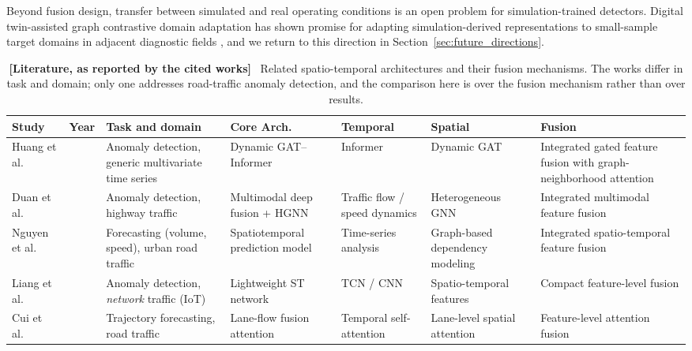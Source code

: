 \documentclass[journal]{IEEEtran}
\begin{document}
Beyond fusion design, transfer between simulated and real operating conditions is an open problem for simulation-trained detectors. Digital twin-assisted graph contrastive domain adaptation has shown promise for adapting simulation-derived representations to small-sample target domains in adjacent diagnostic fields \cite{gcda_bearing}, and we return to this direction in Section~\ref{sec:future_directions}.

\begin{table}[!t]
\centering
\caption{\textbf{[Literature, as reported by the cited works]}~ Related spatio-temporal architectures and their fusion mechanisms. The works differ in task and domain; only one addresses road-traffic anomaly detection, and the comparison here is over the fusion mechanism rather than over results.}
\label{tab:comparison}
\renewcommand{\arraystretch}{1.25}
\footnotesize
\setlength{\tabcolsep}{3pt}
\begin{tabularx}{0.97\textwidth}{@{}>{\raggedright\arraybackslash}p{}>{\centering\arraybackslash}p{}>{\raggedright\arraybackslash}X>{\raggedright\arraybackslash}X>{\raggedright\arraybackslash}X>{\raggedright\arraybackslash}X>{\raggedright\arraybackslash}X@{}}
  \toprule
  \textbf{Study} & \textbf{Year} & \textbf{Task and domain} & \textbf{Core Arch.} & \textbf{Temporal} & \textbf{Spatial} & \textbf{Fusion} \\ \midrule
  Huang et al.~\cite{huang_multivariate_2024} & 2024 & Anomaly detection, generic multivariate time series & Dynamic GAT--Informer & Informer & Dynamic GAT & Integrated gated feature fusion with graph-neighborhood attention \\
  Duan et al.~\cite{sun_framework_2025} & 2025 & Anomaly detection, highway traffic & Multimodal deep fusion + HGNN & Traffic flow / speed dynamics & Heterogeneous GNN & Integrated multimodal feature fusion \\
  Nguyen et al.~\cite{nguyen_spatiotemporal_2026} & 2026 & Forecasting (volume, speed), urban road traffic & Spatiotemporal prediction model & Time-series analysis & Graph-based dependency modeling & Integrated spatio-temporal feature fusion \\
  Liang et al.~\cite{liang_anomaly_2025} & 2025 & Anomaly detection, \emph{network} traffic (IoT) & Lightweight ST network & TCN / CNN & Spatio-temporal features & Compact feature-level fusion \\
  Cui et al.~\cite{cui_lane-flow-learning_2026} & 2026 & Trajectory forecasting, road traffic & Lane-flow fusion attention & Temporal self-attention & Lane-level spatial attention & Feature-level attention fusion \\

\end{tabularx}
\end{table}
\end{document}
